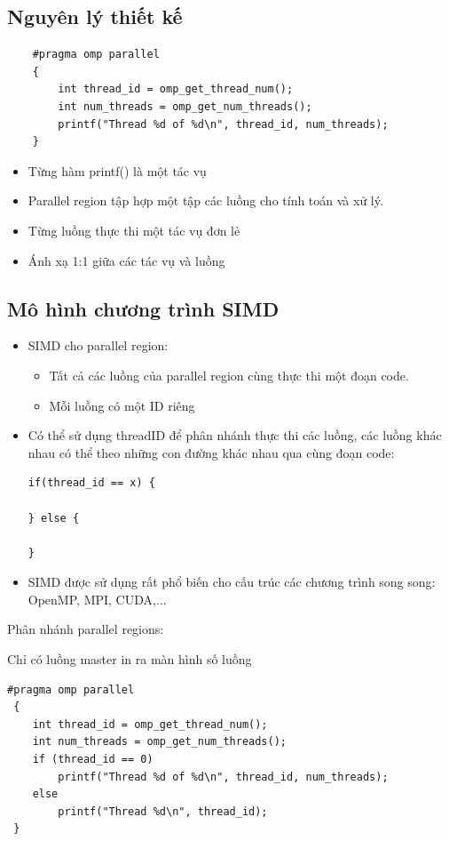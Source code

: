 \documentclass[14pt, a4paper]{article}
\numberwithin{equation}{section}
\numberwithin{figure}{section}
\numberwithin{dl}{section}
\numberwithin{md}{section}
\numberwithin{bd}{section}
\numberwithin{dn}{section}
\numberwithin{hq}{section}
\begin{document}
\subsection{Nguyên lý thiết kế}

\begin{verbatim}
    #pragma omp parallel
    {
        int thread_id = omp_get_thread_num();
        int num_threads = omp_get_num_threads();
        printf("Thread %d of %d\n", thread_id, num_threads); 
    }
\end{verbatim}
\begin{itemize}
    \item Từng hàm printf() là một tác vụ
    \item Parallel region tập hợp một tập các luồng cho tính toán và xử lý.
    \item Từng luồng thực thi một tác vụ đơn lẻ
    \item Ánh xạ 1:1 giữa các tác vụ và luồng
\end{itemize}

\subsection{Mô hình chương trình SIMD}

\begin{itemize}
    \item SIMD cho parallel region:
    \begin{itemize}
        \item Tất cả các luồng của parallel region cùng thực thi một đoạn code.
        \item Mỗi luồng có một ID riêng
    \end{itemize}
    \item Có thể sử dụng threadID để phân nhánh thực thi các luồng, các luồng khác nhau có thể theo những con đường khác nhau qua cùng đoạn code:
    \begin{verbatim}
if(thread_id == x) {

} else {

}
    \end{verbatim}
    \item SIMD được sử dụng rất phổ biến cho cấu trúc các chương trình song song: OpenMP, MPI, CUDA,...
\end{itemize}


Phân nhánh parallel regions:

Chỉ có luồng master in ra màn hình số luồng
        \begin{verbatim}
#pragma omp parallel
 {
    int thread_id = omp_get_thread_num(); 
    int num_threads = omp_get_num_threads();
    if (thread_id == 0) 
        printf("Thread %d of %d\n", thread_id, num_threads); 
    else 
        printf("Thread %d\n", thread_id);
 }
        \end{verbatim}
\end{document}
